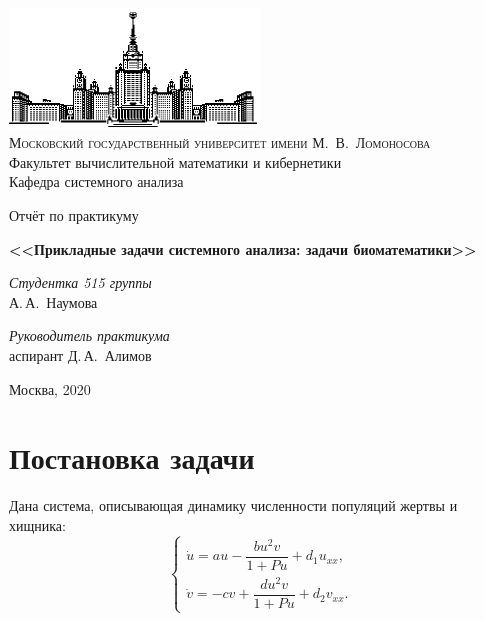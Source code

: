 \documentclass[oneside, final, 12pt]{article}
\begin{document}
\thispagestyle{empty}

\begin{center}
\ \vspace{-3cm}

\includegraphics[width=0.5\textwidth]{msu.eps}\\
{\scshape Московский государственный университет имени М.~В.~Ломоносова}\\
Факультет вычислительной математики и кибернетики\\
Кафедра системного анализа

\vfill

\begin{LARGE}
	Отчёт по практикуму

\end{LARGE}

\vspace{1cm}

\begin{Huge}
\bfseries <<Прикладные задачи системного анализа: задачи биоматематики>>

\end{Huge}

\end{center}

\vspace{1cm}

\begin{flushright}
  \large
  \textit{Студентка 515 группы}\\
  А.\,А.~Наумова

  \vspace{5mm}

  \textit{Руководитель практикума}\\
   аспирант Д.\,А.~Алимов

\end{flushright}

\vfill

\begin{center}
Москва, 2020
\end{center}

\newpage
\tableofcontents								%

\newpage
\section{Постановка задачи}						%
Дана система, описывающая динамику численности популяций жертвы и хищника:
	\[
	\begin{cases}
	\dot{u} = au - \dfrac{bu^2v}{1 + Pu} + d_1u_{xx}, \\
	\dot{v} = -cv + \dfrac{du^2v}{1 + Pu} + d_2v_{xx}.
	\end{cases}
	\]
\end{document}
